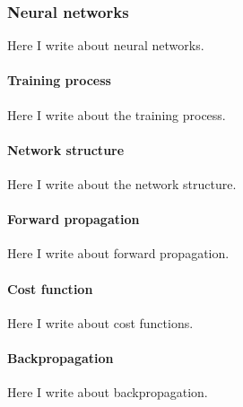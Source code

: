 \subsubsection{Neural networks}
\label{sub:neural_networks}

Here I write about neural networks.

\paragraph*{Training process}

Here I write about the training process.

\paragraph*{Network structure}

Here I write about the network structure.

\paragraph*{Forward propagation}

Here I write about forward propagation.

\paragraph*{Cost function}

Here I write about cost functions.

\paragraph*{Backpropagation}

Here I write about backpropagation.

